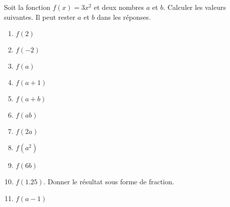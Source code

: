 
\begin{exercice}\label{exosmath-0013}

    Soit la fonction \( f(x)=3x^2\) et deux nombres \( a\) et \( b\). Calculer les valeurs suivantes. Il peut rester \( a\) et \( b\) dans les réponses.
    \begin{multicols}{3}
        \begin{enumerate}
            \item
                \( f(2)\) 
            \item
                \( f(-2)\)
            \item
                \( f(a)\)
            \item
                \( f(a+1)\)
            \item
                \( f(a+b)\)
            \item
                \( f(ab)\)
            \item
                \( f(2a)\)
            \item
                \( f(a^2)\)
            \item
                \( f(6b)\)
            \item
                \( f(1.25)\). Donner le résultat sous forme de fraction.
            \item
                \( f(a-1)\)
        \end{enumerate}
    \end{multicols}

\end{exercice}
